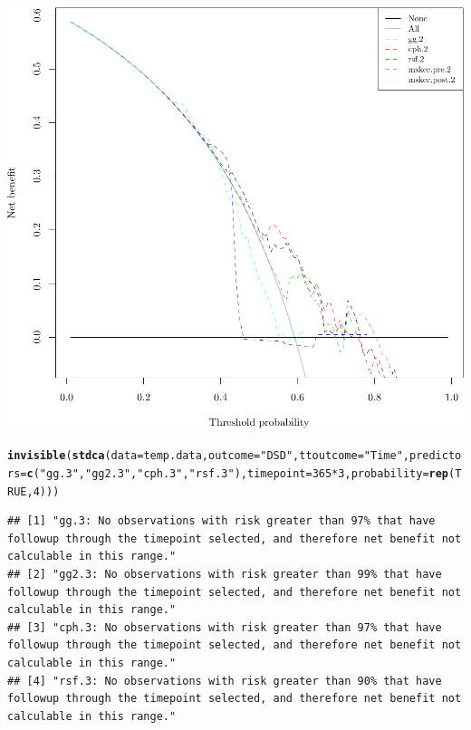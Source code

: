 \documentclass{article}\usepackage[]{graphicx}\usepackage[]{color}
\makeatletter
\def\maxwidth{ %
  \ifdim\Gin@nat@width>\linewidth
    \linewidth
  \else
    \Gin@nat@width
  \fi
}
\newcommand{\hlnum}[1]{\textcolor[rgb]{0.686,0.059,0.569}{#1}}%
\newcommand{\hlstr}[1]{\textcolor[rgb]{0.192,0.494,0.8}{#1}}%
\newcommand{\hlopt}[1]{\textcolor[rgb]{0,0,0}{#1}}%
\newcommand{\hlstd}[1]{\textcolor[rgb]{0.345,0.345,0.345}{#1}}%
\newcommand{\hlkwc}[1]{\textcolor[rgb]{0.333,0.667,0.333}{#1}}%
\newcommand{\hlkwd}[1]{\textcolor[rgb]{0.737,0.353,0.396}{\textbf{#1}}}%
\newenvironment{kframe}{%
 \def\at@end@of@kframe{}%
 \ifinner\ifhmode%
  \def\at@end@of@kframe{\end{minipage}}%
  \begin{minipage}{\columnwidth}%
 \fi\fi%
 \def\FrameCommand##1{\hskip\@totalleftmargin \hskip-\fboxsep
 \colorbox{shadecolor}{##1}\hskip-\fboxsep
     \hskip-\linewidth \hskip-\@totalleftmargin \hskip\columnwidth}%
 \MakeFramed {\advance\hsize-\width
   \@totalleftmargin\z@ \linewidth\hsize
   \@setminipage}}%
 {\par\unskip\endMakeFramed%
 \at@end@of@kframe}
\newenvironment{knitrout}{}{} %
\makeatother
\begin{document}
\begin{knitrout}
{\centering \includegraphics[width=\maxwidth]{figure/05-model-selection-dca-2} 

}


\begin{kframe}\begin{alltt}
\hlkwd{invisible}\hlstd{(}\hlkwd{stdca}\hlstd{(}\hlkwc{data} \hlstd{= temp.data,} \hlkwc{outcome} \hlstd{=} \hlstr{"DSD"}\hlstd{,} \hlkwc{ttoutcome} \hlstd{=} \hlstr{"Time"}\hlstd{,} \hlkwc{predictors} \hlstd{=} \hlkwd{c}\hlstd{(}\hlstr{"gg.3"}\hlstd{,} \hlstr{"gg2.3"}\hlstd{,} \hlstr{"cph.3"}\hlstd{,} \hlstr{"rsf.3"}\hlstd{),} \hlkwc{timepoint} \hlstd{=} \hlnum{365}\hlopt{*}\hlnum{3}\hlstd{,} \hlkwc{probability} \hlstd{=} \hlkwd{rep}\hlstd{(}\hlnum{TRUE}\hlstd{,} \hlnum{4}\hlstd{)))}
\end{alltt}
\begin{verbatim}
## [1] "gg.3: No observations with risk greater than 97% that have followup through the timepoint selected, and therefore net benefit not calculable in this range." 
## [2] "gg2.3: No observations with risk greater than 99% that have followup through the timepoint selected, and therefore net benefit not calculable in this range."
## [3] "cph.3: No observations with risk greater than 97% that have followup through the timepoint selected, and therefore net benefit not calculable in this range."
## [4] "rsf.3: No observations with risk greater than 90% that have followup through the timepoint selected, and therefore net benefit not calculable in this range."
\end{verbatim}
\end{kframe}


\end{knitrout}
\end{document}

